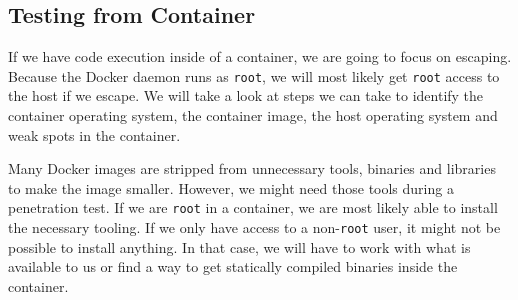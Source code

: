 \subsection{Testing from Container}\label{subsection:testing-container}
If we have code execution inside of a container, we are going to focus on escaping. Because the Docker daemon runs as \lstinline{root}, we will most likely get \lstinline{root} access to the host if we escape. We will take a look at steps we can take to identify the container operating system, the container image, the host operating system and weak spots in the container.

\medskip

Many Docker images are stripped from unnecessary tools, binaries and libraries to make the image smaller. However, we might need those tools during a penetration test. If we are \lstinline{root} in a container, we are most likely able to install the necessary tooling. If we only have access to a non-\lstinline{root} user, it might not be possible to install anything. In that case, we will have to work with what is available to us or find a way to get statically compiled binaries inside the container.








